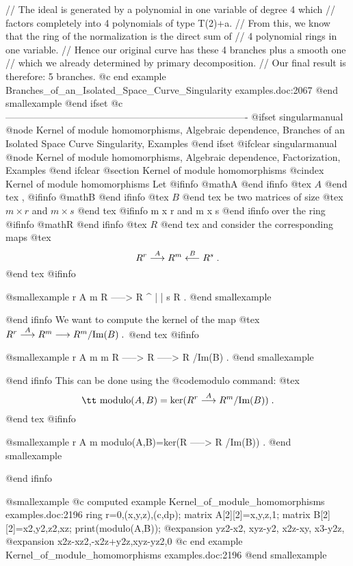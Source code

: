   // The ideal is generated by a polynomial in one variable of degree 4 which
  // factors completely into 4 polynomials of type T(2)+a.
  // From this, we know that the ring of the normalization is the direct sum of 
  // 4 polynomial rings in one variable.
  // Hence our original curve has these 4 branches plus a smooth one
  // which we already determined by primary decomposition.
  // Our final result is therefore: 5 branches.
@c end example Branches_of_an_Isolated_Space_Curve_Singularity examples.doc:2067
@end smallexample
@end ifset
@c ----------------------------------------------------------------------------
@ifset singularmanual
@node Kernel of module homomorphisms, Algebraic dependence, Branches of an Isolated Space Curve Singularity, Examples
@end ifset
@ifclear singularmanual
@node Kernel of module homomorphisms, Algebraic dependence, Factorization, Examples
@end ifclear
@section Kernel of module homomorphisms
@cindex Kernel of module homomorphisms
Let 
@ifinfo
@math{A}
@end ifinfo
@tex
$A$
@end tex
, 
@ifinfo
@math{B}
@end ifinfo
@tex
$B$
@end tex
 be two matrices of size
@tex
$m\times r$ and $m\times s$
@end tex
@ifinfo
m x r and m x s
@end ifinfo
over the ring 
@ifinfo
@math{R}
@end ifinfo
@tex
$R$
@end tex
 and consider the corresponding maps
@tex
$$
R^r \buildrel{A}\over{\longrightarrow}
R^m \buildrel{B}\over{\longleftarrow} R^s\;.
$$
@end tex
@ifinfo

@smallexample
   r   A     m
  R  -----> R
            ^
            |
            |
             s
            R  .
@end smallexample

@end ifinfo
We want to compute the kernel of the map
@tex
$R^r \buildrel{A}\over{\longrightarrow}
R^m\longrightarrow
R^m/\hbox{Im}(B) \;.$
@end tex
@ifinfo

@smallexample
   r   A     m         m
  R  -----> R  -----> R /Im(B) .
@end smallexample

@end ifinfo
This can be done using the @code{modulo} command:
@tex
$$
\hbox{\tt modulo}(A,B)=\hbox{ker}(R^r
\buildrel{A}\over{\longrightarrow}R^m/\hbox{Im}(B)) \; .
$$
@end tex
@ifinfo

@smallexample
                   r   A     m
  modulo(A,B)=ker(R  -----> R /Im(B))  .
@end smallexample

@end ifinfo

@smallexample
@c computed example Kernel_of_module_homomorphisms examples.doc:2196 
  ring r=0,(x,y,z),(c,dp);
  matrix A[2][2]=x,y,z,1;
  matrix B[2][2]=x2,y2,z2,xz;
  print(modulo(A,B));
@expansion{} yz2-x2, xyz-y2,  x2z-xy, x3-y2z,
@expansion{} x2z-xz2,-x2z+y2z,xyz-yz2,0      
@c end example Kernel_of_module_homomorphisms examples.doc:2196
@end smallexample

